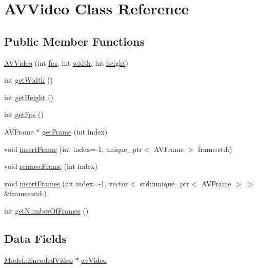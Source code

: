 \hypertarget{classModel_1_1AVVideo}{}\section{A\+V\+Video Class Reference}
\label{classModel_1_1AVVideo}
\subsection*{Public Member Functions}
\begin{DoxyCompactItemize}
\item 
\hyperlink{classModel_1_1AVVideo_af6a4a9766b45d8b9a6c10f0b6c5d8998}{A\+V\+Video} (int \hyperlink{classModel_1_1AVVideo_a45b67662d620a977a2cfe519f7ab6273}{fps}, int \hyperlink{classModel_1_1AVVideo_a2474a5474cbff19523a51eb1de01cda4}{width}, int \hyperlink{classModel_1_1AVVideo_ad12fc34ce789bce6c8a05d8a17138534}{height})
\item 
int \hyperlink{classModel_1_1AVVideo_a67a0997183f24da19b776d96c1052998}{get\+Width} ()
\item 
int \hyperlink{classModel_1_1AVVideo_a07efb2a4e9a982688c8bb3c3f21d1092}{get\+Height} ()
\item 
int \hyperlink{classModel_1_1AVVideo_a519ad5c0664b9de28c1a6d9dc77f959d}{get\+Fps} ()
\item 
A\+V\+Frame $\ast$ \hyperlink{classModel_1_1AVVideo_a5ae52bc55f8cdfa021eb1107beba5f61}{get\+Frame} (int index)
\item 
void \hyperlink{classModel_1_1AVVideo_ace104c676dbfe0dc570e75b8ed79c283}{insert\+Frame} (int index=-\/1, unique\+\_\+ptr$<$ A\+V\+Frame $>$ frame\+:std\+:)
\item 
void \hyperlink{classModel_1_1AVVideo_a2467a8d0c175fdcbacea59e9955d88a9}{remove\+Frame} (int index)
\item 
void \hyperlink{classModel_1_1AVVideo_af7a4bb4befc8330296b9765b4b23a7db}{insert\+Frames} (int index=-\/1, vector$<$ std\+::unique\+\_\+ptr$<$ A\+V\+Frame $>$ $>$ \&frames\+:std\+:)
\item 
int \hyperlink{classModel_1_1AVVideo_a038091d64aa83552571228512789d5ee}{get\+Number\+Of\+Frames} ()
\end{DoxyCompactItemize}
\subsection*{Data Fields}
\begin{DoxyCompactItemize}
\item 
\hyperlink{classModel_1_1EncodedVideo}{Model\+::\+Encoded\+Video} $\ast$ \hyperlink{classModel_1_1AVVideo_a2ee559c7a937231b8bdc36ed5a15d865}{av\+Video}
\end{DoxyCompactItemize}

